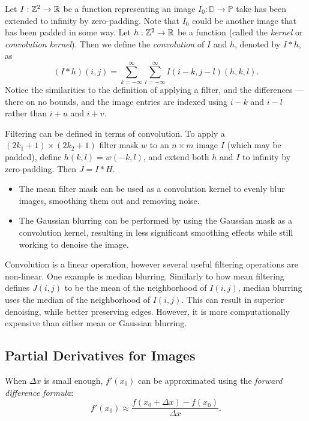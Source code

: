 \begin{defn}
    Let $I: \mathbb{Z}^2 \to \mathbb{R}$ be a function representing an image $I_0: \mathbb{D} \to \mathbb{P}$ take has been extended to infinity by zero-padding. Note that $I_0$ could be another image that has been padded in some way. Let $h: \mathbb{Z}^2 \to \mathbb{R}$ be a function (called the \emph{kernel} or \emph{convolution kernel}). Then we define the \emph{convolution} of $I$ and $h$, denoted by $I * h$, as \[(I * h)(i, j) = \sum_{k=-\infty}^{\infty}\sum_{l=-\infty}^{\infty}I(i - k, j - l)(h, k, l).\] Notice the similarities to the definition of applying a filter, and the differences --- there on no bounds, and the image entries are indexed using $i - k$ and $i - l$ rather than $i + u$ and $i + v$.
\end{defn}

Filtering can be defined in terms of convolution. To apply a $(2k_1 + 1) \times (2k_2 + 1)$ filter mask $w$ to an $n \times m$ image $I$ (which may be padded), define $h(k, l) = w(-k, l)$, and extend both $h$ and $I$ to infinity by zero-padding. Then $J = I * H$.

\begin{exmp}\proofbreak
    \begin{itemize}
        \item The mean filter mask can be used as a convolution kernel to evenly blur images, smoothing them out and removing noise.
        \item The Gaussian blurring can be performed by using the Gaussian mask as a convolution kernel, resulting in less significant smoothing effects while still working to denoise the image.
    \end{itemize}
\end{exmp}

Convolution is a linear operation, however several useful filtering operations are non-linear. One example is median blurring. Similarly to how mean filtering defines $J(i, j)$ to be the mean of the neighborhood of $I(i, j)$, median blurring uses the median of the neighborhood of $I(i, j)$. This can result in superior denoising, while better preserving edges. However, it is more computationally expensive than either mean or Gaussian blurring.

\subsection{Partial Derivatives for Images}

\begin{defn}
    When $\Delta x$ is small enough, $f'(x_0)$ can be approximated using the \emph{forward difference formula}: \[f'(x_0) \approx \frac{f(x_0 + \Delta x) - f(x_0)}{\Delta x}.\]
\end{defn}


